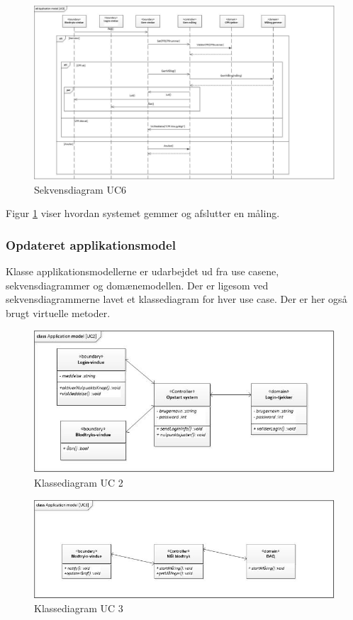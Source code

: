 \begin{figure}[H]
	\includegraphics[width=1\textwidth]{Figurer/ISE/sdAppModelUC6}
	\caption{Sekvensdiagram UC6}
	\label{sd UC6}
\end{figure}

Figur \ref{sd UC6} viser hvordan systemet gemmer og afslutter en måling. 

\subsubsection{Opdateret applikationsmodel}
Klasse applikationsmodellerne er udarbejdet ud fra use casene, sekvensdiagrammer og domænemodellen. Der er ligesom ved sekvensdiagrammerne lavet et klassediagram for hver use case. Der er her også brugt virtuelle metoder. 

\begin{figure}[H]
	\centering
	\includegraphics[width=1\textwidth]{Figurer/ISE/classAppModelUC2}
	\caption{Klassediagram UC 2}
	\label{classApp UC2}
\end{figure}

\begin{figure}[H]
	\centering
	\includegraphics[width=1\textwidth]{Figurer/ISE/classAppModelUC3}
	\caption{Klassediagram UC 3}
	\label{classApp UC3}
\end{figure}

